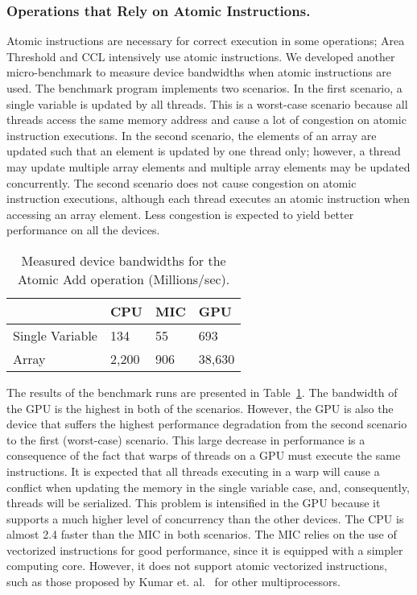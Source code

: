\subsubsection{Operations that Rely on Atomic Instructions.} 
Atomic instructions are necessary for correct execution in some operations; Area 
Threshold and CCL intensively use atomic instructions. We developed
another micro-benchmark to measure device bandwidths when atomic 
instructions are used. The benchmark program implements two scenarios. In the first 
scenario, a single variable is updated by all threads. This is a worst-case scenario 
because all threads access the same memory address and cause a lot of congestion on 
atomic instruction executions. In the second scenario, the elements of an array are 
updated such that an element is updated by one thread only; however, a thread may update 
multiple array elements and multiple array elements may be updated concurrently. The 
second scenario does not cause congestion on atomic instruction executions, although 
each thread executes an atomic instruction when accessing an array element. Less 
congestion is expected to yield better performance on all the devices. 
\begin{table}[h!]
\caption{Measured device bandwidths for the Atomic Add operation (Millions/sec).}
\vspace*{-2ex}
\begin{center}
\begin{tabular}{l l l l}
\hline
   		& CPU	& MIC		&	GPU 	\\ \hline \hline
Single Variable	& 134	& 55		&	693	\\ \hline
Array		& 2,200	& 906		&	38,630  \\ \hline
\end{tabular}
\end{center}
\label{tab:atomic}
\vspace*{-2ex}
\end{table}

The results of the benchmark runs are presented in Table~\ref{tab:atomic}. 
The bandwidth of the GPU is the highest in both of the scenarios. However, 
the GPU is also the
device that suffers the highest performance degradation from the second 
scenario to the first (worst-case) scenario. This large decrease in 
performance 
is a consequence of the fact that warps of threads on a GPU must
execute the same instructions. It is expected that all threads
executing in a warp will cause a conflict when updating the memory 
in the single variable case, and, consequently, threads will be 
serialized. This problem is
intensified in the GPU because it supports a much higher level of concurrency
than the other devices. The CPU is almost 2.4
faster than the MIC in both scenarios. The MIC relies on the use of
vectorized instructions for good performance, since it is equipped with
a simpler computing core. However, it does not support atomic vectorized
instructions, such as those proposed by Kumar et. al.~\cite{4556746} for other
multiprocessors. 

